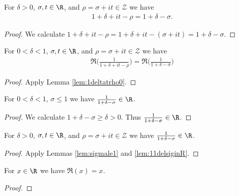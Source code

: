 \begin{lemma}\label{lem:1deltatrho0}  \leanok
For $\delta>0$, $\sigma, t\in\R$, and $\rho=\sigma+it\in \mathcal Z$ we have
\begin{align*}
1+\delta+it-\rho = 1 + \delta -\sigma.
\end{align*}
\end{lemma}
\begin{proof} \leanok
We calculate $1+\delta+it-\rho = 1+\delta+it - (\sigma+it) = 1 + \delta -\sigma$.
\end{proof}

\begin{lemma}\label{lem:1delsigReal}  \leanok
For $0<\delta<1$, $\sigma, t\in\R$, and $\rho=\sigma+it\in \mathcal Z$ we have
\begin{align*}
\Re\Big(\frac{1}{1+\delta+it-\rho}\Big) = \Re\Big(\frac{1}{1 + \delta -\sigma}\Big)
\end{align*}
\end{lemma}
\begin{proof} 
\leanok
Apply Lemma \ref{lem:1deltatrho0}.
\end{proof}

\begin{lemma}\label{lem:11delsiginR}  \leanok
For $0<\delta<1$, $\sigma\le 1$ we have $\frac{1}{1 + \delta -\sigma}\in\R$.
\end{lemma}
\begin{proof} \leanok
We calculate $1+\delta-\sigma\ge\delta>0$. Thus $\frac{1}{1 + \delta -\sigma}\in\R$.
\end{proof}

\begin{lemma}\label{lem:11delsiginR2}  \leanok
For $\delta>0$, $\sigma, t\in\R$, and $\rho=\sigma+it\in \mathcal Z$ we have $\frac{1}{1 + \delta -\sigma}\in\R$.
\end{lemma}
\begin{proof} \leanok {}
Apply Lemmas \ref{lem:sigmale1} and \ref{lem:11delsiginR}.
\end{proof}


\begin{lemma}\label{lem:ReReal}  \leanok
For $x\in\R$ we have $\Re(x)=x$.
\end{lemma}
\begin{proof} \leanok
\end{proof}

